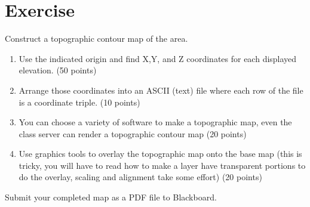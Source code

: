 \documentclass[12pt]{article}
\begin{document}
\section*{\small{Exercise}}
Construct a topographic contour map of the area.
\begin{enumerate}
\item Use the indicated origin and find X,Y, and Z coordinates for each displayed elevation. (50 points)
\item Arrange those coordinates into an ASCII (text) file where each row of the file is a coordinate triple. (10 points)
\item You can choose a variety of software to make a topographic map, even the class server can render a topographic contour map (20 points)
\item Use graphics tools to overlay the topographic map onto the base map (this is tricky, you will have to read how to make a layer have transparent portions to do the overlay, scaling and alignment take some effort) (20 points)
\end{enumerate}

Submit your completed map as a PDF file to Blackboard.
%

%
\end{document}
